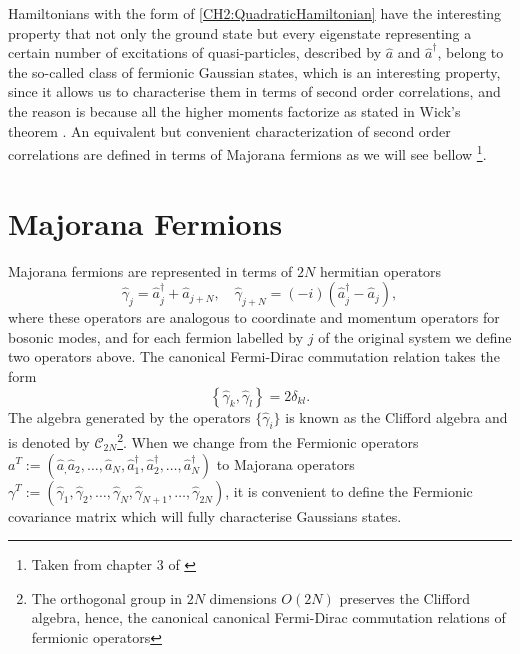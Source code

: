 \indent Hamiltonians with the form of \eqref{CH2:QuadraticHamiltonian} have the interesting property that not only the ground state but every eigenstate representing a certain number of excitations of quasi-particles, described by $\hat{a}$ and $\hat{a}^{\dagger}$, belong to the so-called class of fermionic Gaussian states, which is an interesting property, since it allows us to characterise them in terms of second order correlations, and the reason is because all the higher moments factorize as stated in Wick’s theorem \cite{westwanski_general_1973, molinari_notes_2017, Mario_2018,}. An equivalent but convenient characterization of second order correlations are defined in terms of Majorana fermions as we will see bellow \footnote{Taken from chapter $3$ of \cite{Mario_2018}}.

\section{Majorana Fermions}
Majorana fermions are represented in terms of $2N$ hermitian operators 
\begin{equation}
\hat{\gamma}_{j}=\hat{a}_{j}^{\dagger}+\hat{a}_{j+N}, \quad \hat{\gamma}_{j+N}=(-i)\left(\hat{a}_{j}^{\dagger}-\hat{a}_{j}\right),
\label{CH2:majorana}
\end{equation}
where these operators are analogous to coordinate and momentum operators for bosonic modes, and for each fermion labelled by $j$ of the original system we define two operators above. The canonical Fermi-Dirac commutation relation takes the form
\begin{equation}
\left\{\hat{\gamma}_{k},\hat{\gamma}_{l}\right\}=2 \delta_{k l}.
\label{CH2:CAR_majorana}
\end{equation}
The algebra generated by the operators $\{\hat{\gamma}_i\}$ is known as the Clifford algebra and is denoted by $\mathcal{C}_{2N}$\footnote{The orthogonal group in $2N$ dimensions $O(2N)$ preserves the Clifford algebra, hence, the canonical  canonical Fermi-Dirac commutation relations of fermionic operators}. When we change from the Fermionic operators $a^{T}:=(\hat{a}_,\hat{a}_2,\ldots,\hat{a}_N, \hat{a}^{\dagger}_1,\hat{a}^{\dagger}_2,\ldots,\hat{a}^{\dagger}_N)$ to Majorana operators $\gamma^{T}:=(\hat{\gamma}_1,\hat{\gamma}_2,\ldots, \hat{\gamma}_N,\hat{\gamma}_{N+1},\ldots,\hat{\gamma}_{2N})$, it is convenient to define the Fermionic covariance matrix which will fully characterise Gaussians states.  


